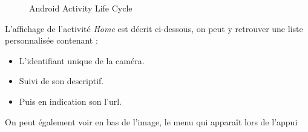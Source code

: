\begin{center}
\begin{figure}[H]
  \label{activityLifeCycle}
  \centering
  \caption{Android Activity Life Cycle\protect\footnotemark}
  \end{figure}
  \end{center}
\newpage
 L'affichage de l'activité \textit{Home} est décrit ci-dessous, on peut y
 retrouver une liste personnalisée contenant :
 \begin{itemize}
   \item L'identifiant unique de la caméra.
   \item Suivi de son descriptif.
   \item Puis en indication son l'url.
 \end{itemize}
 On peut également voir en bas de l'image, le menu qui apparaît lors de l'appui
